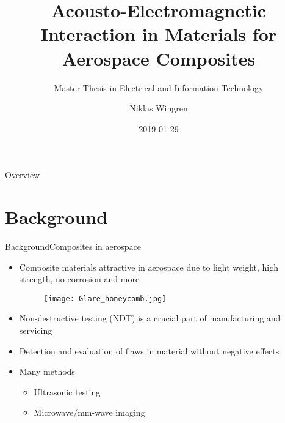 \documentclass[11pt, final]{beamer}
\begin{document}
	
	\newcommand{\mrm}[1]{\mathrm{#1}}
	\newcommand{\eu}{\mrm{e}}
	\newcommand{\iu}{\mrm{i}}	
	
	\author{Niklas Wingren}
	\title[Acousto-Electromagnetic Interaction]{Acousto-Electromagnetic Interaction in Materials for Aerospace Composites}
	\subtitle{Master Thesis in Electrical and Information Technology}
	\date{2019-01-29}
	\frame[plain]{\maketitle}
	
	\begin{frame}{Overview}
		\tableofcontents
	\end{frame}
	
	
	\section{Background}
	
	\begin{frame}{Background}{Composites in aerospace}
		\begin{itemize}
			\item Composite materials attractive in aerospace due to light weight, high strength, no corrosion and more
			\begin{figure}
				\texttt{[image: Glare\_honeycomb.jpg]}
			\end{figure}
			\pause
			\item Non-destructive testing (NDT) is a crucial part of manufacturing and servicing
			\item Detection and evaluation of flaws in material without negative effects
			\pause
			\item Many methods
			\begin{itemize}
				\item Ultrasonic testing
				\item Microwave/mm-wave imaging
			\end{itemize}
		\end{itemize}
		
	\end{frame}
	
\end{document}
